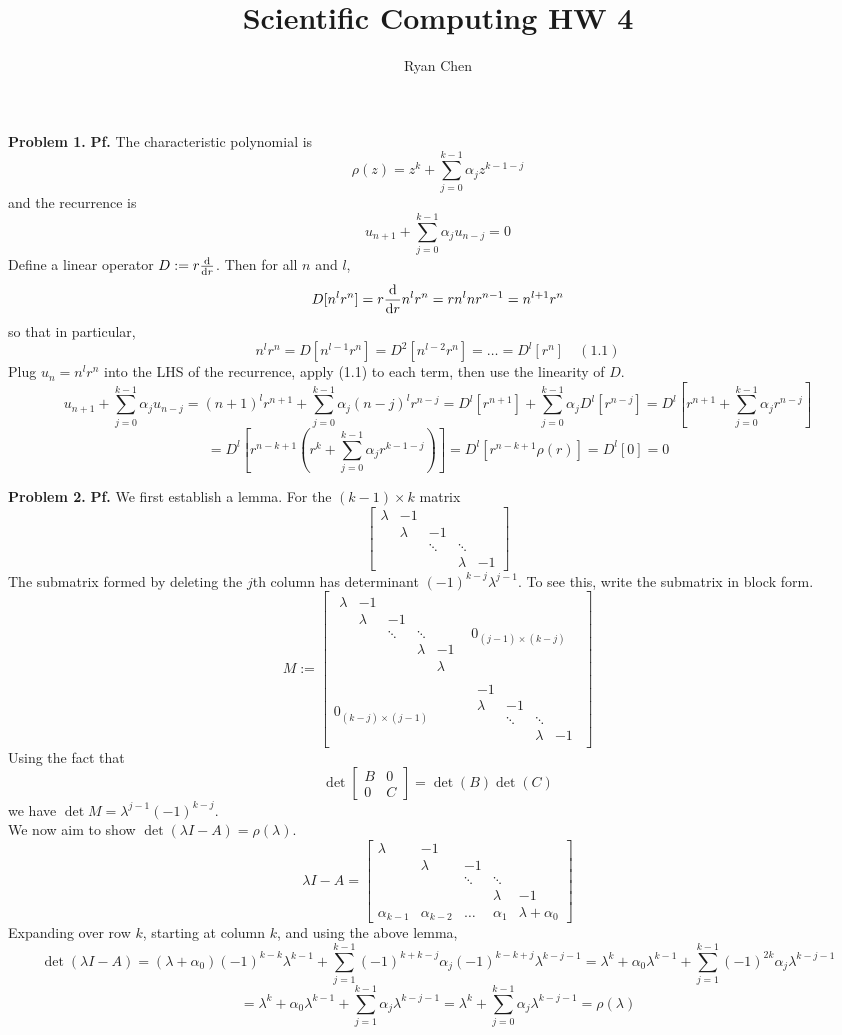 \documentclass{article}
\title{Scientific Computing HW 4}
\author{Ryan Chen}
\def\tbf#1{\textbf{#1}}
\newcommand{\br}[1]{\left(#1\right)}
\newcommand{\sbr}[1]{\left[#1\right]}
\newcommand{\m}[2][b]{\begin{#1matrix}#2\end{#1matrix}}
\newcommand{\pf}{\tbf{Pf. }}
\newcommand{\sep}[1][.5cm]{\vspace{#1}}
\begin{document}
	
\maketitle



\tbf{Problem 1.} \pf The characteristic polynomial is
$$\rho(z) = z^k + \sum_{j=0}^{k-1}\alpha_jz^{k-1-j}$$
and the recurrence is
$$u_{n+1} + \sum_{j=0}^{k-1}\alpha_ju_{n-j} = 0$$
Define a linear operator $D:=r\dv{r}$. Then for all $n$ and $l$,
$$D[n^lr^n] = r\dv{r} n^lr^n = rn^lnr^{n-1} = n^{l+1}r^n$$
so that in particular,
$$n^lr^n = D[n^{l-1}r^n] = D^2[n^{l-2}r^n] = \ldots = D^l[r^n] \quad (1.1)$$
Plug $u_n=n^lr^n$ into the LHS of the recurrence, apply (1.1) to each term, then use the linearity of $D$.
$$u_{n+1} + \sum_{j=0}^{k-1}\alpha_ju_{n-j} = (n+1)^lr^{n+1} + \sum_{j=0}^{k-1}\alpha_j(n-j)^lr^{n-j}
= D^l[r^{n+1}] + \sum_{j=0}^{k-1}\alpha_j D^l[r^{n-j}]
= D^l\sbr{r^{n+1} + \sum_{j=0}^{k-1}\alpha_j r^{n-j}}$$
$$= D^l\sbr{r^{n-k+1}\br{r^k + \sum_{j=0}^{k-1}\alpha_jr^{k-1-j}}}
= D^l[r^{n-k+1}\rho(r)]
= D^l[0]
= 0$$
\sep



\tbf{Problem 2.} \pf We first establish a lemma. For the $(k-1)\times k$ matrix
$$\m{\lambda & -1 \\ & \lambda & -1 \\ & & \ddots & \ddots \\ & & & \lambda & -1}$$
The submatrix formed by deleting the $j$th column has determinant $(-1)^{k-j}\lambda^{j-1}$. To see this, write the submatrix in block form.
$$M :=
	\m{\m[]{\lambda & -1 \\ & \lambda & -1 \\ & & \ddots & \ddots \\ & & & \lambda & -1 \\ & & & & \lambda}
	& 0_{(j-1)\times(k-j)} \\
	0_{(k-j)\times(j-1)}
	& \m[]{-1 \\ \lambda & -1 \\ & \ddots & \ddots \\ & & \lambda & -1}}$$
Using the fact that
$$\det \m{B & 0 \\ 0 & C} = \det(B)\det(C)$$
we have $\det M = \lambda^{j-1}(-1)^{k-j}$.\\

We now aim to show $\det(\lambda I-A)=\rho(\lambda)$.
$$\lambda I-A = \m{
\lambda & -1\\
& \lambda & -1\\
& & \ddots & \ddots\\
& & & \lambda & -1\\
\alpha_{k-1} & \alpha_{k-2} & \dots & \alpha_1 & \lambda+\alpha_0
}$$
Expanding over row $k$, starting at column $k$, and using the above lemma,
$$\det(\lambda I-A)
= (\lambda+\alpha_0)(-1)^{k-k}\lambda^{k-1} + \sum_{j=1}^{k-1}(-1)^{k+k-j}\alpha_j(-1)^{k-k+j}\lambda^{k-j-1}
= \lambda^k + \alpha_0\lambda^{k-1} + \sum_{j=1}^{k-1}(-1)^{2k}\alpha_j\lambda^{k-j-1}$$
$$= \lambda^k + \alpha_0\lambda^{k-1} + \sum_{j=1}^{k-1}\alpha_j\lambda^{k-j-1}
= \lambda^k + \sum_{j=0}^{k-1}\alpha_j\lambda^{k-j-1}
= \rho(\lambda)$$
\sep
\end{document}
